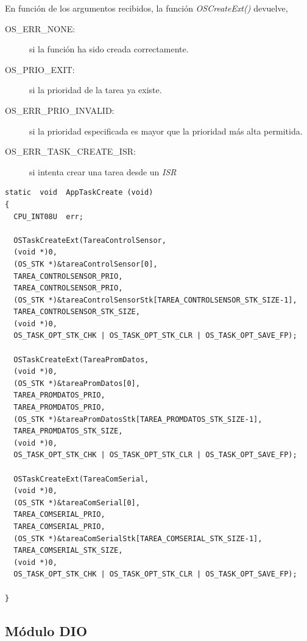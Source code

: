 \documentclass[11pt,a4paper,oneside]{article}
\begin{document}
En función de los argumentos recibidos, la función  \emph{OSCreateExt()} devuelve,
\begin{description}
\item[OS\_ERR\_NONE:] si la función ha sido creada correctamente.
\item[OS\_PRIO\_EXIT:] si la prioridad de la tarea ya existe.
\item[OS\_ERR\_PRIO\_INVALID:] si la prioridad especificada es mayor que la prioridad más alta permitida. 
\item[OS\_ERR\_TASK\_CREATE\_ISR:] si intenta crear una tarea desde un \emph{ISR}
\end{description}

\begin{lstlisting}[caption={Función de la tarea \emph{AppTaskCreate()}},label=code:creates-tasks]
static  void  AppTaskCreate (void)
{
  CPU_INT08U  err;
  
  OSTaskCreateExt(TareaControlSensor,
  (void *)0,
  (OS_STK *)&tareaControlSensor[0],
  TAREA_CONTROLSENSOR_PRIO,
  TAREA_CONTROLSENSOR_PRIO,
  (OS_STK *)&tareaControlSensorStk[TAREA_CONTROLSENSOR_STK_SIZE-1],
  TAREA_CONTROLSENSOR_STK_SIZE,
  (void *)0,
  OS_TASK_OPT_STK_CHK | OS_TASK_OPT_STK_CLR | OS_TASK_OPT_SAVE_FP);

  OSTaskCreateExt(TareaPromDatos,
  (void *)0,
  (OS_STK *)&tareaPromDatos[0],
  TAREA_PROMDATOS_PRIO,
  TAREA_PROMDATOS_PRIO,
  (OS_STK *)&tareaPromDatosStk[TAREA_PROMDATOS_STK_SIZE-1],
  TAREA_PROMDATOS_STK_SIZE,
  (void *)0,
  OS_TASK_OPT_STK_CHK | OS_TASK_OPT_STK_CLR | OS_TASK_OPT_SAVE_FP);

  OSTaskCreateExt(TareaComSerial,
  (void *)0,
  (OS_STK *)&tareaComSerial[0],
  TAREA_COMSERIAL_PRIO,
  TAREA_COMSERIAL_PRIO,
  (OS_STK *)&tareaComSerialStk[TAREA_COMSERIAL_STK_SIZE-1],
  TAREA_COMSERIAL_STK_SIZE,
  (void *)0,
  OS_TASK_OPT_STK_CHK | OS_TASK_OPT_STK_CLR | OS_TASK_OPT_SAVE_FP);

}
\end{lstlisting}

\subsection{Módulo DIO}
\label{sec:mod-dio}
\end{document}
